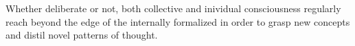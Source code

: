 Whether deliberate or not, both collective and inividual consciousness regularly reach beyond the edge of the internally formalized in order to grasp new concepts and distil novel patterns of thought.

